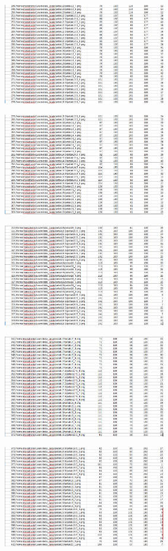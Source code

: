 \documentclass[10pt,journal,compsoc]{IEEEtran}
\begin{document}
  \begin{center}
    \includegraphics[width=200pt]{data_jarak9}
  \end{center}
  \begin{center}
    \includegraphics[width=200pt]{data_jarak10}
  \end{center}
  \begin{center}
    \includegraphics[width=200pt]{data_jarak11}
  \end{center}
  \begin{center}
    \includegraphics[width=200pt]{data_jarak12}
  \end{center}
  \begin{center}
    \includegraphics[width=200pt]{data_jarak13}
  \end{center}
\end{document}
